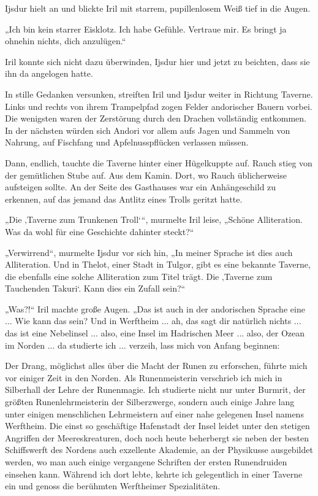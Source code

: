 Ijsdur hielt an und blickte Iril mit starrem, pupillenlosem Weiß tief in die Augen.

„Ich bin kein starrer Eisklotz. Ich habe Gefühle. Vertraue mir. Es bringt ja ohnehin nichts, dich anzulügen.“

Iril konnte sich nicht dazu überwinden, Ijsdur hier und jetzt zu beichten, dass sie ihn da angelogen hatte.\bigskip







In stille Gedanken versunken, streiften Iril und Ijsdur weiter in Richtung Taverne. Links und rechts von ihrem Trampelpfad zogen Felder andorischer Bauern vorbei. Die wenigsten waren der Zerstörung durch den Drachen vollständig entkommen. In der nächsten würden sich Andori vor allem aufs Jagen und Sammeln von Nahrung, auf Fischfang und Apfelnusspflücken verlassen müssen.

Dann, endlich, tauchte die Taverne hinter einer Hügelkuppte auf. Rauch stieg von der gemütlichen Stube auf. Aus dem Kamin. Dort, wo Rauch üblicherweise aufsteigen sollte. An der Seite des Gasthauses war ein Anhängeschild zu erkennen, auf das jemand das Antlitz eines Trolls geritzt hatte.

„Die ‚Taverne zum Trunkenen Troll‘“, murmelte Iril leise, „Schöne Alliteration. Was da wohl für eine Geschichte dahinter steckt?“

„Verwirrend“, murmelte Ijsdur vor sich hin, „In meiner Sprache ist dies auch Alliteration. Und in Thelot, einer Stadt in Tulgor, gibt es eine bekannte Taverne, die ebenfalls eine solche Alliteration zum Titel trägt. Die ‚Taverne zum Tauchenden Takuri‘. Kann dies ein Zufall sein?“

„Was?!“ Iril machte große Augen. „Das ist auch in der andorischen Sprache eine ... Wie kann das sein? Und in Werftheim ... ah, das sagt dir natürlich nichts ... das ist eine Nebelinsel ... also, eine Insel im Hadrischen Meer ... also, der Ozean im Norden ... da studierte ich ... verzeih, lass mich von Anfang beginnen:

Der Drang, möglichst alles über die Macht der Runen zu erforschen, führte mich vor einiger Zeit in den Norden. Als Runenmeisterin verschrieb ich mich in Silberhall der Lehre der Runenmagie. Ich studierte nicht nur unter Burmrit, der größten Runenlehrmeisterin der Silberzwerge, sondern auch einige Jahre lang unter einigen menschlichen Lehrmeistern auf einer nahe gelegenen Insel namens Werftheim. Die einst so geschäftige Hafenstadt der Insel leidet unter den stetigen Angriffen der Meereskreaturen, doch noch heute beherbergt sie neben der besten Schiffswerft des Nordens auch exzellente Akademie, an der Physikusse ausgebildet werden, wo man auch einige vergangene Schriften der ersten Runendruiden einsehen kann. Während ich dort lebte, kehrte ich gelegentlich in einer Taverne ein und genoss die berühmten Werftheimer Spezialitäten.

